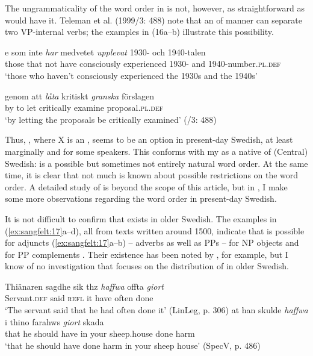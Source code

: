 \documentclass[output=paper, colorlinks, citecolor=brown]{langscibook}
\begin{document}
The ungrammaticality of the word order in  is not, however, as straightforward as \citet{Petzell2011} would have it. Teleman et al. (1999/3: 488) note that an  of manner can separate two VP-internal verbs; the examples in (16a–b) illustrate this possibility.


\ea {}\label{ex:sangfelt:16}
\ea\label{ex:sangfelt:16a}
\gll [d]e som inte \textit{har} {medvetet} \textit{upplevat } 1930- och 1940-talen \\
 those that not have consciously experienced 1930- and 1940-number\textsc{.pl.def}\\
\glt ‘those who haven’t consciously experienced the 1930s and the 1940s’

\ex\label{ex:sangfelt:16b}
\gll genom att \textit{låta} {kritiskt} \textit{granska} förslagen \\
 by to let critically examine proposal.\textsc{pl.def}\\
 \glt ‘by letting the proposals be critically examined’ (\citealt{TelemanEtAl1999}/3: 488)\\
\z
\z

Thus, , where X is an , seems to be an option in present-day Swedish, at least marginally and for some speakers. This conforms with my  as a native  of (Central) Swedish:  is a possible but sometimes not entirely natural word order. At the same time, it is clear that not much is known about possible restrictions on the word order. A detailed study of  is beyond the scope of this article, but in , I make some more observations regarding the word order in present-day Swedish.

It is not difficult to confirm that  exists in older Swedish. The examples in (\ref{ex:sangfelt:17}a–d), all from texts written around 1500, indicate that  is possible for adjuncts (\ref{ex:sangfelt:17}a–b) – adverbs as well as PPs – for NP objects  and for PP complements . Their existence has been noted by \citet[171--172]{Falk1993}, for example, but I know of no investigation that focuses on the distribution of  in older Swedish.


\ea {}\label{ex:sangfelt:17}
\ea\label{ex:sangfelt:17a}
\gll Thiänaren sagdhe sik thz \textit{haffwa} {offta} \textit{giort} \\
 Servant.\textsc{def} said \textsc{refl} it have often done\\
\glt ‘The servant said that he had often done it’ (LinLeg, p. 306)
\ex\label{ex:sangfelt:17b}
\gll at han skulde \textit{haffwa} i {thino} {farahws} \textit{giort} skada \\
 that he should have in your sheep.house done harm\\
\glt ‘that he should have done harm in your sheep house’ (SpecV, p. 486)
\end{document}
